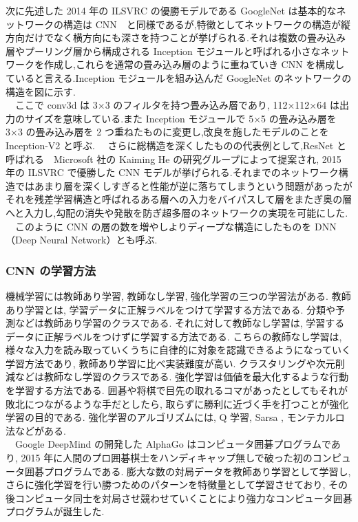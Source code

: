 次に先述した 2014 年の ILSVRC の優勝モデルである GoogleNet は基本的なネットワークの構造は CNN　と同様であるが,特徴としてネットワークの構造が縦方向だけでなく横方向にも深さを持つことが挙げられる.それは複数の畳み込み層やプーリング層から構成される Inception モジュールと呼ばれる小さなネットワークを作成し,これらを通常の畳み込み層のように重ねていき CNN を構成していると言える.Inception モジュールを組み込んだ GoogleNet のネットワークの構造を図に示す.\\
　ここで conv3d は 3×3 のフィルタを持つ畳み込み層であり, 112×112×64 は出力のサイズを意味している.また Inception モジュールで 5×5 の畳み込み層を 3×3 の畳み込み層を 2 つ重ねたものに変更し,改良を施したモデルのことを Inception-V2 と呼ぶ.
　さらに総構造を深くしたものの代表例として,ResNet と呼ばれる　Microsoft 社の Kaiming He の研究グループによって提案され, 2015 年の ILSVRC で優勝した CNN モデルが挙げられる.それまでのネットワーク構造ではあまり層を深くしすぎると性能が逆に落ちてしまうという問題があったがそれを残差学習構造と呼ばれるある層への入力をバイパスして層をまたぎ奥の層へと入力し,勾配の消失や発散を防ぎ超多層のネットワークの実現を可能にした.\\
　このように CNN の層の数を増やしよりディープな構造にしたものを DNN（Deep Neural Network）とも呼ぶ.
\subsubsection{CNN の学習方法}
機械学習には教師あり学習,
教師なし学習,
強化学習の三つの学習法がある.
教師あり学習とは,
学習データに正解ラベルをつけて学習する方法である.
分類や予測などは教師あり学習のクラスである.
それに対して教師なし学習は,
学習するデータに正解ラベルをつけずに学習する方法である.
こちらの教師なし学習は,
様々な入力を読み取っていくうちに自律的に対象を認識できるようになっていく学習方法であり,
教師あり学習に比べ実装難度が高い.
クラスタリングや次元削減などは教師なし学習のクラスである.
強化学習は価値を最大化するような行動を学習する方法である.
囲碁や将棋で目先の取れるコマがあったとしてもそれが敗北につながるような手だとしたら,
取らずに勝利に近づく手を打つことが強化学習の目的である.
強化学習のアルゴリズムには,
Q 学習,
Sarsa ,
モンテカルロ法などがある.\\
　Google DeepMind の開発した AlphaGo はコンピュータ囲碁プログラムであり,
2015 年に人間のプロ囲碁棋士をハンディキャップ無しで破った初のコンピュータ囲碁プログラムである.
膨大な数の対局データを教師あり学習として学習し,
さらに強化学習を行い勝つためのパターンを特徴量として学習させており,
その後コンピュータ同士を対局させ競わせていくことにより強力なコンピュータ囲碁プログラムが誕生した.
